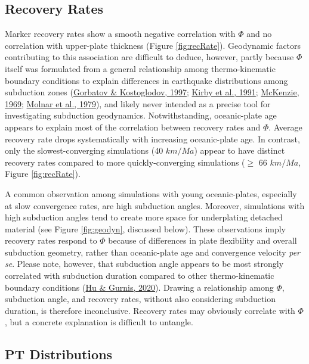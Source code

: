 \hypertarget{recovery-rates-1}{%
\subsection{Recovery Rates}\label{recovery-rates-1}}

Marker recovery rates show a smooth negative correlation with \(\Phi\) and no correlation with upper-plate thickness (Figure \ref{fig:recRate}). Geodynamic factors contributing to this association are difficult to deduce, however, partly because \(\Phi\) itself was formulated from a general relationship among thermo-kinematic boundary conditions to explain differences in earthquake distributions among subduction zones (\protect\hyperlink{ref-gorbatov1997}{Gorbatov \& Kostoglodov, 1997}; \protect\hyperlink{ref-kirby1991}{Kirby et al., 1991}; \protect\hyperlink{ref-mckenzie1969}{McKenzie, 1969}; \protect\hyperlink{ref-molnar1979}{Molnar et al., 1979}), and likely never intended as a precise tool for investigating subduction geodynamics. Notwithstanding, oceanic-plate age appears to explain most of the correlation between recovery rates and \(\Phi\). Average recovery rate drops systematically with increasing oceanic-plate age. In contrast, only the slowest-converging simulations (40 \(km/Ma\)) appear to have distinct recovery rates compared to more quickly-converging simulations (\(\geq\) 66 \(km/Ma\), Figure \ref{fig:recRate}).

A common observation among simulations with young oceanic-plates, especially at slow convergence rates, are high subduction angles. Moreover, simulations with high subduction angles tend to create more space for underplating detached material (see Figure \ref{fig:geodyn}, discussed below). These observations imply recovery rates respond to \(\Phi\) because of differences in plate flexibility and overall subduction geometry, rather than oceanic-plate age and convergence velocity \emph{per se}. Please note, however, that subduction angle appears to be most strongly correlated with subduction duration compared to other thermo-kinematic boundary conditions (\protect\hyperlink{ref-hu2020}{Hu \& Gurnis, 2020}). Drawing a relationship among \(\Phi\), subduction angle, and recovery rates, without also considering subduction duration, is therefore inconclusive. Recovery rates may obviously correlate with \(\Phi\), but a concrete explanation is difficult to untangle.

\hypertarget{pt-distributions}{%
\subsection{PT Distributions}\label{pt-distributions}}

